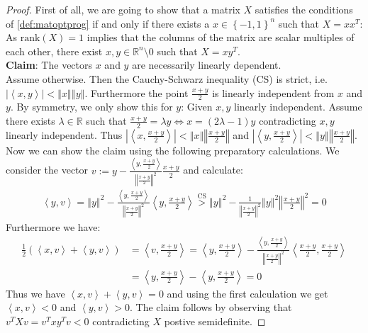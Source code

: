 \documentclass[12pt,a4paper]{article}
\theoremstyle{mythm}
\begin{document}
\begin{proof}
First of all, we are going to show that a matrix $ X $ satisfies the conditions of \ref{def:matoptprog} if and only if there exists a $ x \in \left\{ -1,1 \right\} ^{ n }  $
such that $ X = xx^T $: \\
As $ \text{rank} (X) = 1$ implies that the columns of the matrix are scalar multiples of each other, there exist $ x,y \in \mathbb{R} ^{ n } \setminus {0}  $ such that $ X =
xy^T $. \\
\textbf{Claim}: The vectors $x $ and $ y $ are necessarily linearly dependent. \\
Assume otherwise. Then the Cauchy-Schwarz inequality (CS) is strict, i.e. $ \left| \left\langle x , y \right\rangle \right| < \left\Vert x \right\Vert \left\Vert y
\right\Vert   $. Furthermore the point $ \frac{ x+y }{ 2 }  $ is linearly independent from $ x $ and $ y $. By symmetry, we only show this for $ y $: 
Given $ x,y $ linearly independent. Assume there exists $ \lambda \in \mathbb{R}  $ such that $ \frac{ x+y }{ 2 } = \lambda y \Leftrightarrow x = (2 \lambda -1) y$
contradicting $ x,y $ linearly independent. Thus $ \left| \left\langle x , \frac{ x+y }{ 2 }  \right\rangle  \right| < \left\Vert x \right\Vert \left\Vert \frac{ x+y }{ 2 }
\right\Vert  $   and
$ \left| \left\langle y ,  \frac{ x+y }{ 2 } \right\rangle  \right| < \left\Vert y \right\Vert \left\Vert \frac{ x+y }{ 2 } \right\Vert  $. 
Now we can show the claim using the following preparatory calculations.
We consider the vector $ v := y - \frac{ \left\langle y , \frac{ x+y }{ 2 } \right\rangle  }{ \left\Vert \frac{ x+y }{ 2 } \right\Vert ^{ 2 }  }  \frac{ x+y }{ 2 } $ and
calculate:
\begin{align*}
\left\langle y , v \right\rangle = \left\Vert y \right\Vert ^{ 2 } - \frac{ \left\langle y , \frac{ x+y }{ 2 } \right\rangle  }{ \left\Vert \frac{ x+y }{ 2 } \right\Vert ^{ 2
}  } \left\langle y , \frac{ x+y }{ 2 } \right\rangle \overset{ \text{CS}  }{ >} \left\Vert y \right\Vert ^{ 2 } - \frac{ 1 }{ \left\Vert \frac{ x+y }{ 2 } \right\Vert ^{ 2 }
} \left\Vert y \right\Vert ^{ 2 } \left\Vert \frac{ x+y }{ 2 } \right\Vert ^{ 2 } =0 
\end{align*} 
Furthermore we have:
\begin{align*}
\frac{ 1 }{ 2 } \left(  \left\langle x , v \right\rangle + \left\langle y , v  \right\rangle \right) &= 
\left\langle v  , \frac{ x+y }{ 2 }  \right\rangle = \left\langle y , \frac{ x+y }{ 2 }
\right\rangle - \frac{ \left\langle y , \frac{ x+y }{ 2 }  \right\rangle  }{ \left\Vert \frac{ x+y }{ 2 }  \right\Vert ^{ 2 }  } \left\langle \frac{ x+y }{ 2 } , \frac{ x+y }{
2 } \right\rangle \\
&= \left\langle y , \frac{ x+y }{ 2 } \right\rangle - \left\langle y , \frac{ x+y }{ 2 }  \right\rangle =0
\end{align*} 
Thus we have $ \left\langle x , v \right\rangle + \left\langle y , v  \right\rangle =0 $ and using the first calculation we get $ \left\langle x , v \right\rangle <0 $ and $
\left\langle y , v  \right\rangle   > 0$. 
The claim follows by observing that $ v ^T X v = v ^T x y ^T v < 0  $ contradicting $ X $ postive semidefinite.


\end{proof}
\end{document}
